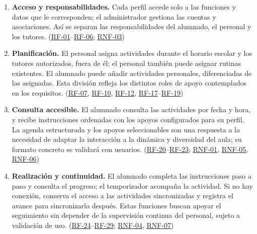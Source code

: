 \begin{enumerate}[leftmargin=*]
  \item \textbf{Acceso y responsabilidades.} Cada perfil accede solo a las funciones y datos que le corresponden; el administrador gestiona las cuentas y asociaciones. Así se separan las responsabilidades del alumnado, el personal y los tutores. (\hyperlink{rf-01}{RF-01}--\hyperlink{rf-06}{RF-06}; \hyperlink{rnf-03}{RNF-03})

  \item \textbf{Planificación.} El personal asigna actividades durante el horario escolar y los tutores autorizados, fuera de él; el personal también puede asignar rutinas existentes. El alumnado puede añadir actividades personales, diferenciadas de las asignadas. Esta división refleja los distintos roles de apoyo contemplados en los requisitos. (\hyperlink{rf-07}{RF-07}, \hyperlink{rf-10}{RF-10}, \hyperlink{rf-12}{RF-12}, \hyperlink{rf-17}{RF-17}--\hyperlink{rf-19}{RF-19})

  \item \textbf{Consulta accesible.} El alumnado consulta las actividades por fecha y hora, y recibe instrucciones ordenadas con los apoyos configurados para su perfil. La agenda estructurada y los apoyos seleccionables son una respuesta a la necesidad de adaptar la interacción a la dinámica y diversidad del aula; su formato concreto se validará con usuarios. (\hyperlink{rf-20}{RF-20}--\hyperlink{rf-23}{RF-23}; \hyperlink{rnf-01}{RNF-01}, \hyperlink{rnf-05}{RNF-05}, \hyperlink{rnf-06}{RNF-06})

  \item \textbf{Realización y continuidad.} El alumnado completa las instrucciones paso a paso y consulta el progreso; el temporizador acompaña la actividad. Si no hay conexión, conserva el acceso a las actividades sincronizadas y registra el avance para sincronizarlo después. Estas funciones buscan apoyar el seguimiento sin depender de la supervisión continua del personal, sujeto a validación de uso. (\hyperlink{rf-24}{RF-24}--\hyperlink{rf-29}{RF-29}; \hyperlink{rnf-04}{RNF-04}, \hyperlink{rnf-07}{RNF-07})

\end{enumerate}
